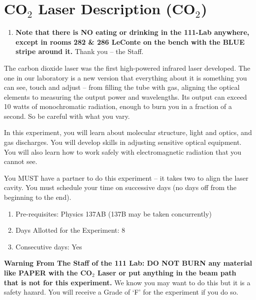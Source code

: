 \documentclass{../lab}
\begin{document}
\maketitle

\tableofcontents

\section{CO\texorpdfstring{$_2$}{2} Laser Description (CO\texorpdfstring{$_2$}{2})}

\begin{enumerate}
    \item \textbf{Note that there is NO eating or drinking in the 111-Lab anywhere, except in rooms 282 \& 286 LeConte on the bench with the BLUE stripe around it.} Thank you -- the Staff.

\end{enumerate}

The carbon dioxide laser was the first high-powered infrared laser developed. The one in our laboratory is a new version that everything about it is something you can see, touch and adjust -- from filling the tube with gas, aligning the optical elements to measuring the output power and wavelengths. Its output can exceed 10 watts of monochromatic radiation, enough to burn you in a fraction of a second. So be careful with what you vary.

In this experiment, you will learn about molecular structure, light and optics, and gas discharges. You will develop skills in adjusting sensitive optical equipment. You will also learn how to work safely with electromagnetic radiation that you cannot see.

You MUST have a partner to do this experiment -- it takes two to align the laser cavity. You must schedule your time on successive days (no days off from the beginning to the end).

\begin{enumerate}
    \item Pre-requisites: Physics 137AB (137B may be taken concurrently)

    \item Days Allotted for the Experiment: 8

    \item Consecutive days: Yes

\end{enumerate}

\textbf{Warning From The Staff of the 111 Lab: DO NOT BURN any material like PAPER with the CO$_2$ Laser or put anything in the beam path that is not for this experiment.} We know you may want to do this but it is a safety hazard. You will receive a Grade of `F' for the experiment if you do so.
\end{document}
